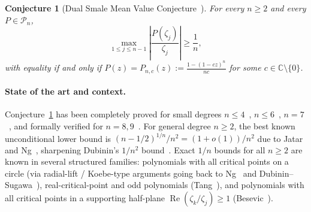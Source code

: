 \documentclass[11pt,a4paper]{article}
\newtheorem{conjecture}[theorem]{Conjecture}
\theoremstyle{definition}
\theoremstyle{remark}
\newcommand{\CC}{\mathbb{C}}
\DeclareMathOperator{\RePart}{Re}
\begin{document}
\begin{conjecture}[Dual Smale Mean Value Conjecture~\cite{DubininSugawa2009}]
\label{conj:dual-smale}
For every $n \ge 2$ and every $P \in \mathcal{P}_n$,
\[
\max_{1 \le j \le n-1} \left|\frac{P(\zeta_j)}{\zeta_j}\right| \ge \frac{1}{n},
\]
with equality if and only if $P(z) = P_{n,c}(z) := \frac{1 - (1 - cz)^n}{nc}$ for some $c \in \CC \setminus \{0\}$.
\end{conjecture}

\paragraph{State of the art and context.}
Conjecture~\ref{conj:dual-smale} has been completely proved for small degrees $n \le 4$~\cite{DubininSugawa2009}, $n \le 6$~\cite{NgZhang2016}, $n = 7$~\cite{Tyson2019}, and formally verified for $n = 8, 9$~\cite{BesevicN8,BesevicN9}. For general degree $n \ge 2$, the best known unconditional lower bound is $(n - 1/2)^{1/n}/n^2 = (1 + o(1))/n^2$ due to Jatar and Ng~\cite{JatarNg2026}, sharpening Dubinin's $1/n^2$ bound~\cite{Dubinin2019}. Exact $1/n$ bounds for all $n \ge 2$ are known in several structured families: polynomials with all critical points on a circle (via radial-lift / Koebe-type arguments going back to Ng~\cite{Ng2003} and Dubinin--Sugawa~\cite{DubininSugawa2009}), real-critical-point and odd polynomials (Tang~\cite{Tang2025}), and polynomials with all critical points in a supporting half-plane $\RePart(\zeta_k/\zeta_j) \ge 1$ (Besevic~\cite{BesevicAllN}).
\end{document}
